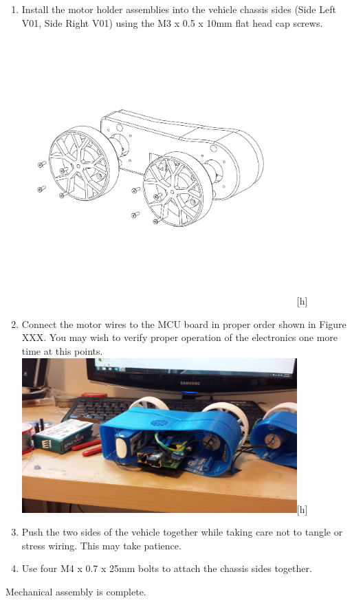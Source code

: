\documentclass[12pt,titlepage,oneside]{memoir}
\begin{document}
\begin{enumerate}
\item Install the motor holder assemblies into the vehicle chassis sides (Side Left V01, Side Right V01) using the M3 x 0.5 x 10mm flat head cap screws.\\
\includegraphics[width=400px]{assem/step4.PDF}[h]
\item Connect the motor wires to the MCU board in proper order shown in Figure XXX. You may wish to verify proper operation of the electronics one more time at this points.\\
\includegraphics[width=400px]{picture/side.jpg}[h]
\item Push the two sides of the vehicle together while taking care not to tangle or stress wiring. This may take patience. 
\item Use four M4 x 0.7 x 25mm bolts to attach the chassis sides together.

\end{enumerate}

Mechanical assembly is complete.
\end{document}
